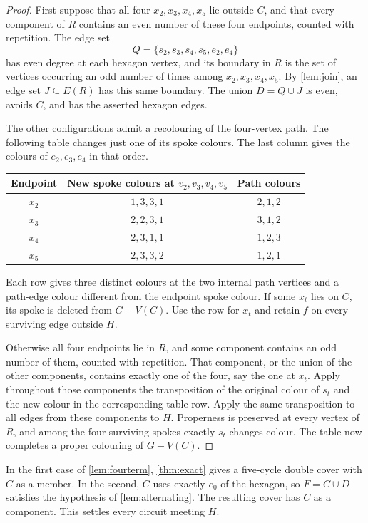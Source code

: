 \documentclass[justified,notoc,twoside,nobib,nofonts]{tufte-handout}
\begin{document}
\begin{proof}
First suppose that all four $x_2,x_3,x_4,x_5$ lie outside $C$, and
that every component of $R$ contains an even number of these four
endpoints, counted with repetition. The edge set
\[
  Q=\{s_2,s_3,s_4,s_5,e_2,e_4\}
\]
has even degree at each hexagon vertex, and its boundary in $R$ is
the set of vertices occurring an odd number of times among
$x_2,x_3,x_4,x_5$. By \cref{lem:join}, an
edge set $J\subseteq E(R)$ has this same boundary. The union
$D=Q\cup J$ is even, avoids $C$, and has the asserted hexagon edges.

The other configurations admit a recolouring of the four-vertex
path. The following table changes just one of its spoke colours.
The last column gives the colours of $e_2,e_3,e_4$ in that order.
\begin{center}
\small
\begin{tabular}{@{}ccc@{}}
\toprule
Endpoint & New spoke colours at $v_2,v_3,v_4,v_5$ & Path colours\\
\midrule
$x_2$ & $1,3,3,1$ & $2,1,2$\\
$x_3$ & $2,2,3,1$ & $3,1,2$\\
$x_4$ & $2,3,1,1$ & $1,2,3$\\
$x_5$ & $2,3,3,2$ & $1,2,1$\\
\bottomrule
\end{tabular}
\end{center}
Each row gives three distinct colours at the two internal path
vertices and a path-edge colour different from the endpoint spoke
colour. If some $x_t$ lies on $C$, its spoke is deleted from $G-V(C)$.
Use the row for $x_t$ and retain $f$ on every surviving edge outside $H$.

Otherwise all four endpoints lie in $R$, and some component contains
an odd number of them, counted with repetition. That component, or
the union of the other components, contains exactly one of the four,
say the one at $x_t$. Apply throughout those components the
transposition of the original colour of $s_t$ and the new colour in
the corresponding table row. Apply the same transposition to all
edges from these components to $H$. Properness is preserved at every
vertex of $R$, and among the four surviving spokes exactly $s_t$
changes colour. The table now completes a proper colouring of
$G-V(C)$.
\end{proof}

In the first case of \cref{lem:fourterm}, \cref{thm:exact} gives a
five-cycle double cover with $C$ as a member. In the second, $C$ uses
exactly $e_0$ of the hexagon, so $F=C\cup D$ satisfies the hypothesis of
\cref{lem:alternating}. The resulting cover has $C$ as a component.
This settles every circuit meeting $H$.
\end{document}
